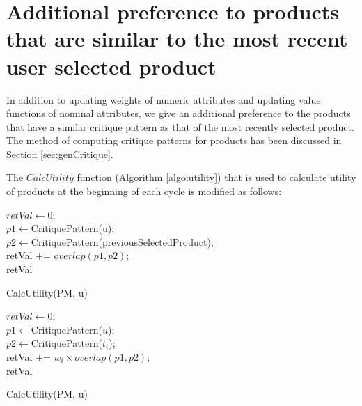 \section{Additional preference to products that are similar to the most recent user selected product}
In addition to updating weights of numeric attributes and updating value functions of nominal attributes, we give an additional preference to the products that have a similar critique pattern as that of the most recently selected product.
The method of computing critique patterns for products has been discussed in Section \ref{sec:genCritique}.

The $CalcUtility$ function (Algorithm \ref{algo:utility}) that is used to calculate utility of products at the beginning of each cycle is modified as follows:

\begin{algorithm}[ht]
  \DontPrintSemicolon

  $retVal \gets 0$;\\
  $p1 \gets $CritiquePattern(u);\\
  $p2 \gets $CritiquePattern(previousSelectedProduct);\\
  retVal += $overlap(p1, p2)$;\\
  \Return retVal
  \caption{CalcUtility(PM, u)}
  \label{algo:wMLT}
\end{algorithm}



\begin{algorithm}[ht]
  \DontPrintSemicolon

  $retVal \gets 0$;\\
   {
      $p1 \gets $CritiquePattern($u$);\\
      $p2 \gets $CritiquePattern($t_i$);\\
      retVal += $w_i \times overlap(p1, p2)$;\\
  }
  \Return retVal
  \caption{CalcUtility(PM, u)}
  \label{algo:wMLT2}
\end{algorithm}
